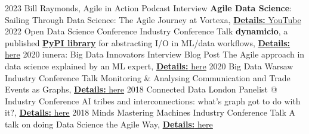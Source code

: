 \documentclass[]{../../../../friggeri-cv}
\begin{document}
\begin{entrylist2}
    \entrytwo
        {\small 2023}
        {\small Bill Raymonds, Agile in Action}
        {\small Podcast Interview}
        {\small \textbf{Agile Data Science}: Sailing Through Data Science: The Agile Journey at Vortexa, \underline{\textbf{Details:} \href{https://christos-hadjinikolis.github.io//2023/10/31/Agile-In-Action.html}{YouTube}}}
    \entrytwo
        {\small 2022}
        {\small Open Data Science Conference}
        {\small Industry Conference Talk}
        {\small \textbf{dynamicio}, a published \href{https://pypi.org/project/dynamicio/}{\textbf{PyPI library}} for abstracting I/O in ML/data workflows, \underline{\textbf{Details:} \href{https://odsc.com/speakers/dynamicio-a-pandas-i-o-wrapper-why-you-should-start-your-ml-ops-journey-with-wrapping-your-i-o/}{here}}}
    \entrytwo
        {\small 2020}
        {\small iunera: Big Data Innovators}
        {\small Interview Blog Post}
        {\small The Agile approach in data science explained by an ML expert, \underline{\textbf{Details:} \href{https://www.iunera.com/kraken/interviews/the-agile-approach-in-data-science-explained-by-an-ml-expert/}{here}}}
    \entrytwo
        {\small 2020}
        {\small Big Data Warsaw}
        {\small Industry Conference Talk}
        {\small Monitoring \& Analysing Communication and Trade Events as Graphs, \underline{\textbf{Details:} \href{https://bigdatatechwarsaw.eu/agenda/}{here}}}
    \entrytwo
        {\small 2018}
        {\small Connected Data London}
        {\small Panelist @ Industry Conference}
        {\small AI tribes and interconnections: what's graph got to do with it?, \underline{\textbf{Details:} \href{http://connected-data.london/2018/09/23/ai-tribes-and-interconnections-whats-graph-got-to-do-with-it/}{here}}}
    \entrytwo
        {\small 2018}
        {\small Minds Mastering Machines}
        {\small Industry Conference Talk}
        {\small A talk on doing Data Science the Agile Way, \underline{\textbf{Details:} \href{https://2018.mcubed.london/sessions/data-science-agile-way/}{here}}}
\end{entrylist2}
\end{document}
